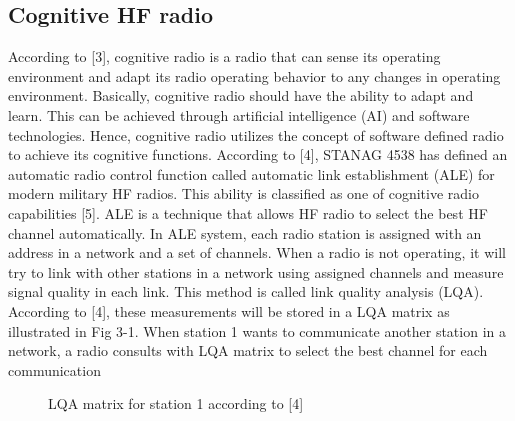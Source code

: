 \documentclass[conference]{IEEEtran}
\begin{document}
\subsection{Cognitive HF radio}
According to [3], cognitive radio is a radio that can sense its operating environment and adapt its radio operating behavior to any changes in operating environment. Basically, cognitive radio should have the ability to adapt and learn. This can be achieved through artificial intelligence (AI) and software technologies. Hence, cognitive radio utilizes the concept of software defined radio to achieve its cognitive functions. 
According to [4], STANAG 4538 has defined an automatic radio control function called automatic link establishment (ALE) for modern military HF radios. This ability is classified as one of cognitive radio capabilities [5]. ALE is a technique that allows HF radio to select the best HF channel automatically. In ALE system, each radio station is assigned with an address in a network and a set of channels. When a radio is not operating, it will try to link with other stations in a network using assigned channels and measure signal quality in each link. This method is called link quality analysis (LQA). According to [4], these measurements will be stored in a LQA matrix as illustrated in Fig 3-1. When station 1 wants to communicate another station in a network, a radio consults with LQA matrix to select the best channel for each communication

\begin{figure}[h!]
	\centering
	\caption{LQA matrix for station 1 according to [4]}
\end{figure}
\end{document}

